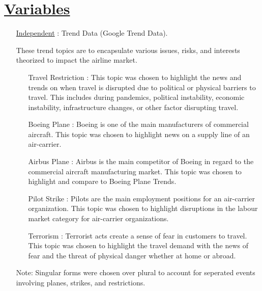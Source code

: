 \documentclass[12pt]{report}
\begin{document}
\section*{\underline{Variables}}
\begin{enumerate}
 \item[\underline{Independent}]: Trend Data (Google Trend Data).
    These trend topics are to encapsulate various issues, risks, and interests theorized to impact the airline market.
        \begin{enumerate}
            \item[Travel Restriction]: This topic was chosen to highlight the news and trends on when travel is disrupted due to political or physical barriers to travel.
            This includes during pandemics, political instability, economic instability, infrastructure changes, or other factor disrupting travel.
            \item[Boeing Plane]: Boeing is one of the main manufacturers of commercial aircraft.
            This topic was chosen to highlight news on a supply line of an air-carrier.
            \item[Airbus Plane]: Airbus is the main competitor of Boeing in regard to the commercial aircraft manufacturing market.
            This topic was chosen to highlight and compare to Boeing Plane Trends.
            \item[Pilot Strike]: Pilots are the main employment positions for an air-carrier organization.
            This topic was chosen to highlight disruptions in the labour market category for air-carrier organizations.
            \item[Terrorism]: Terrorist acts create a sense of fear in customers to travel.
            This topic was chosen to highlight the travel demand with the news of fear and the threat of physical danger whether at home or abroad.
        \end{enumerate}
{\tiny Note: Singular forms were chosen over plural to account for seperated events involving planes, strikes, and restrictions.}



\end{enumerate}
\end{document}
